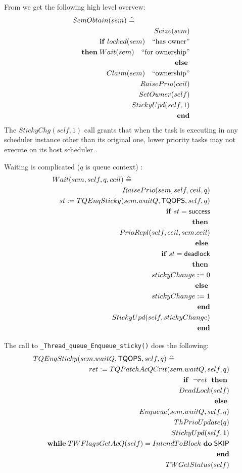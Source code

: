From \cite[pp43--44]{Gomes:2019:MrsP} we get the following high level overvew:
\begin{eqnarray*}
   \lefteqn{SemObtain(sem) ~ \defs}
\\ && Seize(sem)
\\ && \IF locked(sem) \quad \textrm{``has owner''}
\\ && \THEN Wait(sem)  \quad \textrm{``for ownership''}
\\ && \ELSE
\\ && \quad Claim(sem) \quad \textrm{``ownership''}
\\ && \quad RaisePrio(ceil)
\\ && \quad SetOwner(self)
\\ && \quad StickyUpd(self,1)
\\ && \END
\end{eqnarray*}
The $StickyChg(self,1)$ call
grants that when the task is executing in any scheduler instance
other than its original one,
lower priority tasks may not execute on its host scheduler
\cite{Gomes:2019:MrsP}.

Waiting is complicated ($q$ is queue context)
\cite[Appendix 2]{Gomes:2019:MrsP}:
\begin{eqnarray*}
   \lefteqn{Wait(sem,self,q,ceil)~\defs}
\\&& RaisePrio(sem,self,ceil,q)
\\&& st := TQEnqSticky(sem.waitQ,\mathsf{TQOPS},self,q)
\\&& \IF st = \mathsf{success}
\\&& \THEN
\\&& \quad PrioRepl(self,ceil,sem.ceil)
\\&& \ELSE
\\&& \quad \IF st = \mathsf{deadlock}
\\&& \quad \THEN
\\&& \qquad stickyChange := 0
\\&& \quad \ELSE
\\&& \qquad stickyChange := 1
\\&& \quad \END
\\&& \quad StickyUpd(self,stickyChange)
\\&& \END
\end{eqnarray*}

The call to \verb"_Thread_queue_Enqueue_sticky()" does the following:
\begin{eqnarray*}
   \lefteqn{TQEnqSticky(sem.waitQ,\mathsf{TQOPS},self,q)~\defs}
\\&& ret := TQPatchAcQCrit(sem.waitQ,self,q)
\\&& \IF ~\lnot ret ~\THEN
\\&& \quad DeadLock(self)
\\&& \ELSE
\\&& \quad Enqueue(sem.waitQ,self,q)
\\&& \quad ThPrioUpdate(q)
\\&& \quad StickyUpd(self,1)
\\&& \quad \WHILE TWFlagsGetAcQ(self) = IntendToBlock ~\DO \SKIP
\\&& \END
\\&& TWGetStatus(self)
\end{eqnarray*}

